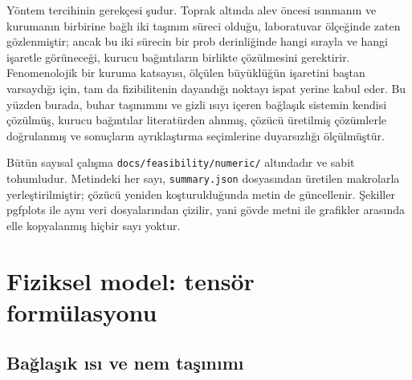 \documentclass[11pt,a4paper]{article}
\begin{document}
Yöntem tercihinin gerekçesi şudur. Toprak altında alev öncesi ısınmanın ve
kurumanın birbirine bağlı iki taşınım süreci olduğu, laboratuvar ölçeğinde
zaten gözlenmiştir; ancak bu iki sürecin bir prob derinliğinde hangi sırayla
ve hangi işaretle görüneceği, kurucu bağıntıların birlikte çözülmesini
gerektirir. Fenomenolojik bir kuruma katsayısı, ölçülen büyüklüğün işaretini
baştan varsaydığı için, tam da fizibilitenin dayandığı noktayı ispat yerine
kabul eder. Bu yüzden burada, buhar taşınımını ve gizli ısıyı içeren bağlaşık
sistemin kendisi çözülmüş, kurucu bağıntılar literatürden alınmış, çözücü
üretilmiş çözümlerle doğrulanmış ve sonuçların ayrıklaştırma seçimlerine
duyarsızlığı ölçülmüştür.

Bütün sayısal çalışma \texttt{docs/feasibility/numeric/} altındadır ve sabit
tohumludur. Metindeki her sayı, \texttt{summary.json} dosyasından üretilen
makrolarla yerleştirilmiştir; çözücü yeniden koşturulduğunda metin de
güncellenir. Şekiller pgfplots ile aynı veri dosyalarından çizilir, yani
gövde metni ile grafikler arasında elle kopyalanmış hiçbir sayı yoktur.

\section{Fiziksel model: tensör formülasyonu}

\subsection{Bağlaşık ısı ve nem taşınımı}
\end{document}
